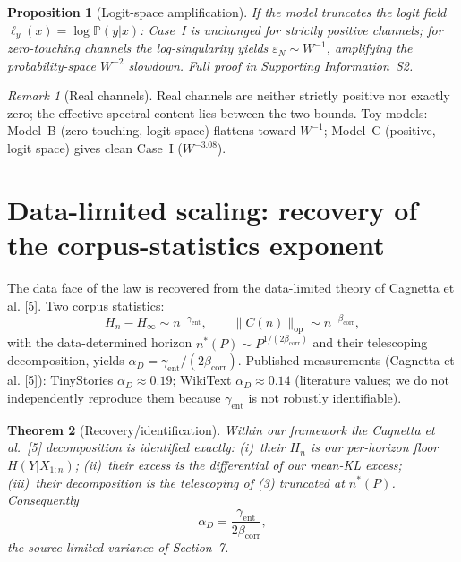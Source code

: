 \documentclass[12pt]{article}
\newcommand{\eps}{\varepsilon}
\newcommand{\Prob}{\mathbb{P}}
\newtheorem{theorem}{Theorem}[section]
\newtheorem{proposition}[theorem]{Proposition}
\theoremstyle{remark}
\newtheorem{remark}{Remark}
\begin{document}
\begin{proposition}[Logit-space amplification]
\label{prop:logit}
If the model truncates the logit field $\ell_y(x)=\log\Prob(y|x)$:
Case~I is unchanged for strictly positive channels; for zero-touching
channels the log-singularity yields $\eps_N\sim W^{-1}$, amplifying the
probability-space $W^{-2}$ slowdown.
Full proof in Supporting Information~S2.
\end{proposition}

\begin{remark}[Real channels]
\label{rem:logit}
Real channels are neither strictly positive nor exactly zero; the effective
spectral content lies between the two bounds.  Toy models: Model~B
(zero-touching, logit space) flattens toward $W^{-1}$; Model~C (positive, logit
space) gives clean Case~I ($W^{-3.08}$).
\end{remark}

\section{Data-limited scaling: recovery of the corpus-statistics exponent}
\label{sec:data}

The data face of the law is recovered from the data-limited theory of
Cagnetta et al. [5].  Two corpus statistics:
\begin{equation}
  H_n - H_\infty \sim n^{-\gamma_{\mathrm{ent}}},
  \qquad
  \|C(n)\|_{\mathrm{op}}\sim n^{-\beta_{\mathrm{corr}}},
  \label{eq:entropy}
\end{equation}
with the data-determined horizon $n^*(P)\sim P^{1/(2\beta_{\mathrm{corr}})}$ and
their telescoping decomposition, yields
$\alpha_D=\gamma_{\mathrm{ent}}/(2\beta_{\mathrm{corr}})$.
Published measurements (Cagnetta et al. [5]): TinyStories
$\alpha_D\!\approx\!0.19$; WikiText $\alpha_D\!\approx\!0.14$ (literature
values; we do not independently reproduce them because $\gamma_{\mathrm{ent}}$ is
not robustly identifiable).

\begin{theorem}[Recovery/identification]
\label{thm:recovery}
Within our framework the Cagnetta et al.\ [5] decomposition is identified exactly:
(i)~their $H_n$ is our per-horizon floor $H(Y|X_{1:n})$; (ii)~their excess is
the differential of our mean-KL excess; (iii)~their decomposition is the
telescoping of (3) truncated at $n^*(P)$.  Consequently
\begin{equation}
  \alpha_D=\frac{\gamma_{\mathrm{ent}}}{2\beta_{\mathrm{corr}}},
  \label{eq:alphaD}
\end{equation}
the source-limited variance of Section~7.
\end{theorem}
\end{document}
